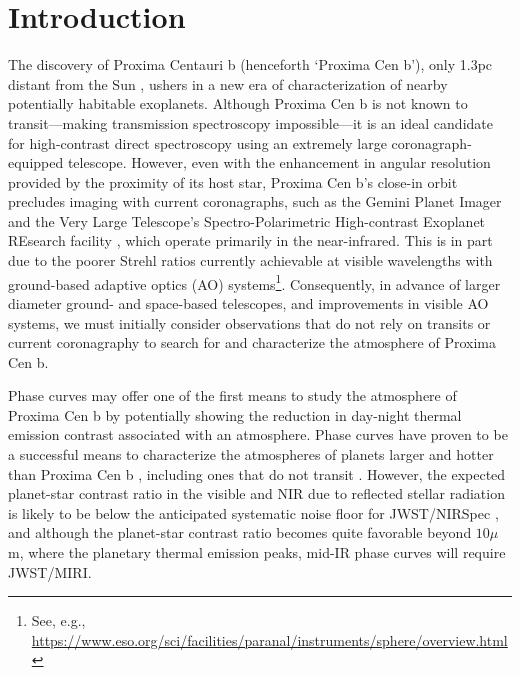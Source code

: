 \documentclass{emulateapj}
\begin{document}


\section{Introduction\label{sec:intro}}

The discovery of Proxima Centauri b (henceforth `Proxima Cen b'), only 1.3pc distant from the Sun \citep{Anglada-Escude2016}, ushers in a new era of characterization of nearby potentially habitable exoplanets. Although Proxima Cen b is not known to transit---making transmission spectroscopy impossible---it is an ideal candidate for high-contrast direct spectroscopy using an extremely large coronagraph-equipped telescope. However, even with the enhancement in angular resolution provided by the proximity of its host star, Proxima Cen b's close-in orbit \citep[$a = 0.0485$ AU;][]{Anglada-Escude2016} precludes imaging with current coronagraphs, such as the Gemini Planet Imager \citep[GPI;][]{Macintosh2014} and the Very Large Telescope's Spectro-Polarimetric High-contrast Exoplanet REsearch facility \citep[VLT-SPHERE;][]{Beuzit2008}, which operate primarily in the near-infrared. This is in part due to the poorer Strehl ratios currently achievable at visible wavelengths with ground-based adaptive optics (AO) systems\footnote{See, e.g., \url{https://www.eso.org/sci/facilities/paranal/instruments/sphere/overview.html}}. Consequently, in advance of larger diameter ground- and space-based telescopes, and improvements in visible AO systems, we must initially consider observations that do not rely on transits or current coronagraphy to search for and characterize the atmosphere of Proxima Cen b.

Phase curves may offer one of the first means to study the atmosphere of Proxima Cen b \citep{Turbet2016,Kreidberg2016,Meadows2016} by potentially showing the reduction in day-night thermal emission contrast associated with an atmosphere. Phase curves have proven to be a successful means to characterize the atmospheres of planets larger and hotter than Proxima Cen b \citep{Cowan2007, Knutson2007, Knutson2008, Crossfield2010, Brogi2012, Zellem2014, Stevenson2014}, including ones that do not transit \citep{Selsis2011, Faigler2011, Maurin2012, Brogi2014}. However, the expected planet-star contrast ratio in the visible and NIR due to reflected stellar radiation is likely to be below the anticipated systematic noise floor for JWST/NIRSpec \citep{Meadows2016}, and although the planet-star contrast ratio becomes quite favorable beyond $10\mu$m, where the planetary thermal emission peaks, mid-IR phase curves will require JWST/MIRI. 
\end{document}
